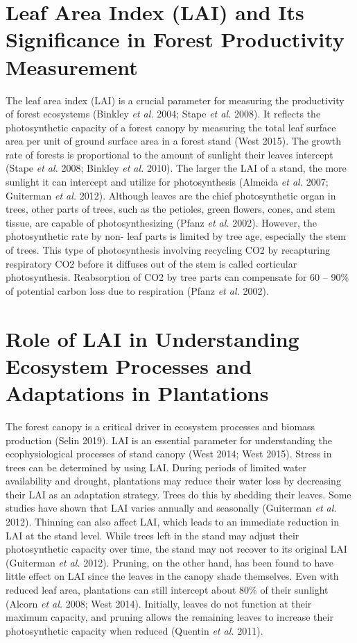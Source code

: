 \documentclass[11pt, a4paper]{report}
\begin{document}
\section{Leaf Area Index (LAI) and Its Significance in Forest Productivity Measurement}
The leaf area index (LAI) is a crucial parameter for measuring the productivity of
forest ecosystems (Binkley \textit{et al.} 2004; Stape \textit{et al.} 2008). It reflects the photosynthetic capacity of a forest canopy by measuring the total leaf surface area per unit of ground surface area in a forest stand (West 2015). The growth rate of forests is proportional to the amount of sunlight their leaves intercept (Stape \textit{et al.} 2008; Binkley \textit{et al.} 2010). The larger the LAI of a stand, the more sunlight it can intercept and utilize for photosynthesis (Almeida \textit{et al.} 2007; Guiterman \textit{et al.} 2012). Although leaves are the chief photosynthetic organ in trees, other parts of
trees, such as the petioles, green flowers, cones, and stem tissue, are capable of
photosynthesizing (Pfanz \textit{et al.} 2002). However, the photosynthetic rate by non-
leaf parts is limited by tree age, especially the stem of trees. This type of
photosynthesis involving recycling CO2 by recapturing respiratory CO2 before it
diffuses out of the stem is called corticular photosynthesis. Reabsorption of CO2 by
tree parts can compensate for 60 – 90\% of potential carbon loss due to respiration
(Pfanz \textit{et al.} 2002).

\section{Role of LAI in Understanding Ecosystem Processes and Adaptations in Plantations}
The forest canopy is a critical driver in ecosystem processes and biomass production (Selin 2019). LAI is an essential parameter for understanding the ecophysiological processes of stand canopy (West 2014; West 2015). Stress in trees can be determined by using LAI. During periods of limited water availability and drought, plantations may reduce their water loss by decreasing their LAI as an adaptation strategy. Trees do this by shedding their leaves. Some studies have shown that LAI varies annually and seasonally (Guiterman \textit{et al.} 2012). Thinning can also affect LAI, which leads to an immediate reduction in LAI at the stand level. While trees left in the stand may adjust their photosynthetic capacity over time, the stand may not recover to its original LAI (Guiterman \textit{et al.} 2012). Pruning, on the other hand, has been found to have little effect on LAI since the leaves in the canopy shade themselves. Even with reduced leaf area, plantations can still intercept about 80\% of their sunlight (Alcorn \textit{et al.} 2008; West 2014). Initially, leaves do not function at their maximum capacity, and pruning allows the remaining leaves to increase their photosynthetic capacity when reduced (Quentin \textit{et al.} 2011).
\end{document}
